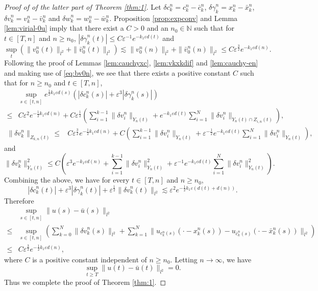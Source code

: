 \documentclass[11pt]{amsart}
\theoremstyle{remark}
\numberwithin{equation}{section}
\begin{document}
\begin{proof}[Proof of of the latter part of Theorem \ref{thm:1}]
Let ${\delta c}_k^n=c_k^n-\bar{c}_k^n$, ${\delta\gamma}_k^n=x_k^n-\bar{x}_k^n$,
${\delta v}_k^n=v_k^n-\bar{v}_k^n$ and ${\delta w}_k^n=w_k^n-\bar{w}_k^n$.
Proposition \ref{prop:expconv} and Lemma \ref{lem:virial-0u} imply that
there exist a $C>0$ and an $n_0\in{\mathbb{N}}$ such that for $t\in[T,n]$ and $n\ge n_0$,
$|{\delta\gamma}_k^n(t)|\le C{\varepsilon}^{-1}e^{-k_1{\varepsilon} d(t)}$ and
\begin{equation}
  \label{eq:bv0n}
 \sup_t(\|v_0^n(t)\|_{l^2}+\|\bar{v}_0^n(t)\|_{l^2})
\lesssim \|v_0^n(n)\|_{l^2}+\|\bar{v}_0^n(n)\|_{l^2}\le C{\varepsilon}^{\frac32}e^{-k_1{\varepsilon} d(n)}.
\end{equation}
Following the proof of Lemmas  \ref{lem:cauchyxc}, \ref{lem:vkxkdif}
and \ref{lem:cauchy-en} and making use of \eqref{eq:bv0n},
we see that there exists a positive constant $C$ such that
for $n\ge n_0$ and $t\in[T,n]$,
\begin{align*}
& \sup_{s\in[t,n]}e^{\frac12k_1{\varepsilon} d(s)}(|{\delta c}_k^n(s)|+{\varepsilon}^3|{\delta\gamma}_k^n(s)|)
\\ \le  & C{\varepsilon}^2e^{-\frac12k_1{\varepsilon} d(n)}+
C{\varepsilon}^{\frac12}\left(\sum_{i=1}^{k-1}\|{\delta v}_i^n\|_{Y_n(t)}
+e^{-k_1{\varepsilon} d(t)}\sum_{i=1}^N\|{\delta v}_i^n\|_{Y_n(t)\cap Z_{i,n}(t)}\right),
\end{align*}
\begin{align*}
 \|{\delta v}_k^n\|_{Z_{k,n}(t)} \le & C{\varepsilon}^{\frac32}e^{-\frac12k_1{\varepsilon} d(n)}
+C\left(\sum_{i=1}^{k-1}\|{\delta v}_i^n\|_{Y_n(t)}
+{\varepsilon}^{-\frac12}e^{-k_1{\varepsilon} d(t)}\sum_{i=1}^{N}\|{\delta v}_i^n\|_{Y_n(t)}\right),
\end{align*}
and
\begin{equation*}
\|{\delta v}_k^n\|_{Y_n(t)}^2 \le C\left({\varepsilon}^3e^{-k_1{\varepsilon} d(n)}
+\sum_{i=1}^{k-1}\|{\delta v}_i^n\|_{Y_n(t)}^2
+{\varepsilon}^{-1}e^{-k_1{\varepsilon} d(t)}\sum_{i=1}^N\|{\delta v}_i^n\|_{Y_n(t)}^2\right).
\end{equation*}
Combining the above, we have for every $t\in[T,n]$ and $n\ge n_0$,
$$|{\delta c}_k^n(t)|+{\varepsilon}^3|{\delta\gamma}_k^n(t)|+{\varepsilon}^{\frac12}\|{\delta v}_k^n(t)\|_{l^2}
\lesssim {\varepsilon}^2e^{-\frac12k_1{\varepsilon}(d(t)+d(n))}.$$
Therefore
\begin{align*}
& \sup_{s\in[t,n]} \|u(s)-\bar{u}(s)\|_{l^2}
\\ \le & 
\sup_{s\in[t,n]}\left(\sum_{k=0}^N\|{\delta v}_k^n(s)\|_{l^2}+\sum_{k=1}^N
\|u_{c_k^n(s)}(\cdot-x_k^n(s))-u_{\bar{c}_k^n(s)}(\cdot-\bar{x}_k^n(s))\|_{l^2}\right)
\\ \le & C{\varepsilon}^{\frac32}e^{-\frac12k_1{\varepsilon} d(n)},
\end{align*}
where $C$ is a positive constant independent of $n\ge n_0$.
Letting $n\to\infty$, we have $$\sup_{t\ge T}\|u(t)-\bar{u}(t)\|_{l^2}=0.$$
Thus we complete the proof of Theorem \ref{thm:1}.
\end{proof}
\end{document}
